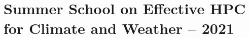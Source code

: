 \chapter{Summer School on Effective HPC for Climate and Weather -- 2021}
\label{ch:ss2021}

\title{}

\section{}
